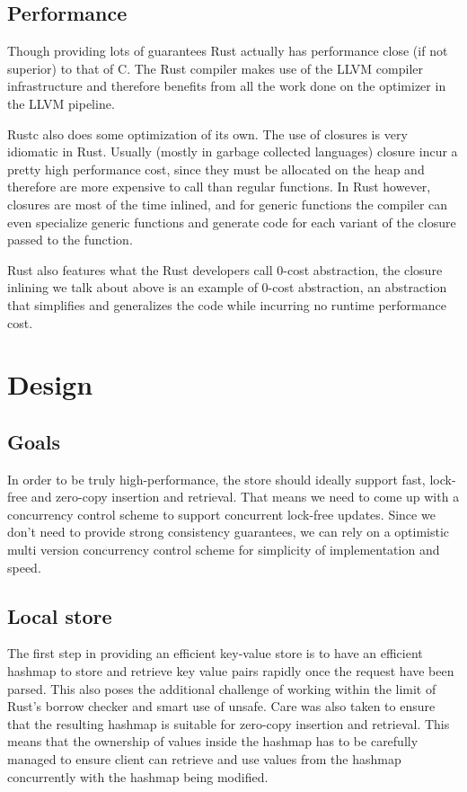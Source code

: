 \documentclass[11pt]{article}
\begin{document}
\subsection{Performance}
Though providing lots of guarantees Rust actually has performance
close (if not superior) to that of C. The Rust compiler makes use of
the LLVM compiler infrastructure and therefore benefits from all the
work done on the optimizer in the LLVM pipeline.

Rustc also does some optimization of its own. The use of closures is very
idiomatic in Rust. Usually (mostly in garbage collected languages)
closure incur a pretty high performance cost, since they must be
allocated on the heap and therefore are more expensive to call than
regular functions. In Rust however, closures are most of the time
inlined, and for generic functions the compiler can even specialize
generic functions and generate code for each variant of the closure
passed to the function.

Rust also features what the Rust developers call 0-cost abstraction,
the closure inlining we talk about above is an example of 0-cost
abstraction, an abstraction that simplifies and generalizes the code
while incurring no runtime performance cost.

\section{Design}

\subsection{Goals}
In order to be truly high-performance, the store should ideally
support fast, lock-free and zero-copy insertion and retrieval. That
means we need to come up with a concurrency control scheme to support
concurrent lock-free updates. Since we don't need to provide strong
consistency guarantees, we can rely on a optimistic multi version
concurrency control scheme for simplicity of implementation and
speed.

\subsection{Local store} \label{design-overview}
The first step in providing an efficient key-value store is to
have an efficient hashmap to store and retrieve key value pairs
rapidly once the request have been parsed. This also poses the
additional challenge of working within the limit of Rust's borrow
checker and smart use of unsafe. Care was also taken to ensure that
the resulting hashmap is suitable for zero-copy insertion and
retrieval. This means that the ownership of values inside the hashmap
has to be carefully managed to ensure client can retrieve and use
values from the hashmap concurrently with the hashmap being modified.
\end{document}
